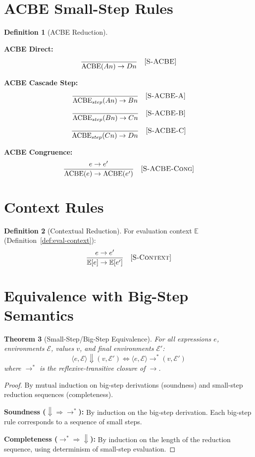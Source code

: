 \documentclass[11pt,twoside,openright]{book}
\theoremstyle{definition}
\newtheorem{definition}{Definition}[chapter]
\theoremstyle{plain}
\newtheorem{theorem}[definition]{Theorem}
\theoremstyle{remark}
\newcommand{\smallstep}{\to}
\newcommand{\bigstep}{\Downarrow}
\begin{document}
\section{ACBE Small-Step Rules}

\begin{definition}[ACBE Reduction]
\label{def:acbe-smallstep}

\textbf{ACBE Direct:}
\[
\frac{}
{\mathrm{ACBE}(An) \smallstep Dn} \quad [\textsc{S-ACBE}]
\]

\textbf{ACBE Cascade Step:}
\[
\frac{}
{\mathrm{ACBE}_{step}(An) \smallstep Bn} \quad [\textsc{S-ACBE-A}]
\]
\[
\frac{}
{\mathrm{ACBE}_{step}(Bn) \smallstep Cn} \quad [\textsc{S-ACBE-B}]
\]
\[
\frac{}
{\mathrm{ACBE}_{step}(Cn) \smallstep Dn} \quad [\textsc{S-ACBE-C}]
\]

\textbf{ACBE Congruence:}
\[
\frac{e \smallstep e'}
{\mathrm{ACBE}(e) \smallstep \mathrm{ACBE}(e')} \quad [\textsc{S-ACBE-Cong}]
\]
\end{definition}

\section{Context Rules}

\begin{definition}[Contextual Reduction]
\label{def:context-reduction}
For evaluation context $\mathbb{E}$ (Definition~\ref{def:eval-context}):
\[
\frac{e \smallstep e'}
{\mathbb{E}[e] \smallstep \mathbb{E}[e']} \quad [\textsc{S-Context}]
\]
\end{definition}

\section{Equivalence with Big-Step Semantics}

\begin{theorem}[Small-Step/Big-Step Equivalence]
\label{thm:step-equivalence}
For all expressions $e$, environments $\mathcal{E}$, values $v$, and final environments $\mathcal{E}'$:
\[
\langle e, \mathcal{E} \rangle \bigstep (v, \mathcal{E}') \iff \langle e, \mathcal{E} \rangle \smallstep^* (v, \mathcal{E}')
\]
where $\smallstep^*$ is the reflexive-transitive closure of $\smallstep$.
\end{theorem}

\begin{proof}
By mutual induction on big-step derivations (soundness) and small-step reduction sequences (completeness).

\textbf{Soundness ($\bigstep \Rightarrow \smallstep^*$):}
By induction on the big-step derivation. Each big-step rule corresponds to a sequence of small steps.

\textbf{Completeness ($\smallstep^* \Rightarrow \bigstep$):}
By induction on the length of the reduction sequence, using determinism of small-step evaluation.
\end{proof}
\end{document}
